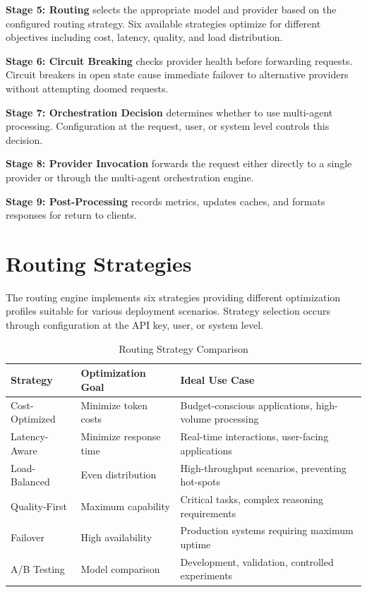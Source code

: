\documentclass[12pt,a4paper,twoside]{report}
\begin{document}
\textbf{Stage 5: Routing} selects the appropriate model and provider based on the configured routing strategy. Six available strategies optimize for different objectives including cost, latency, quality, and load distribution.

\textbf{Stage 6: Circuit Breaking} checks provider health before forwarding requests. Circuit breakers in open state cause immediate failover to alternative providers without attempting doomed requests.

\textbf{Stage 7: Orchestration Decision} determines whether to use multi-agent processing. Configuration at the request, user, or system level controls this decision.

\textbf{Stage 8: Provider Invocation} forwards the request either directly to a single provider or through the multi-agent orchestration engine.

\textbf{Stage 9: Post-Processing} records metrics, updates caches, and formats responses for return to clients.

\section{Routing Strategies}

The routing engine implements six strategies providing different optimization profiles suitable for various deployment scenarios. Strategy selection occurs through configuration at the API key, user, or system level.

\begin{table}[h]
\centering
\begin{tabular}{@{}p{3cm}p{3.5cm}p{5cm}@{}}
\toprule
\textbf{Strategy} & \textbf{Optimization Goal} & \textbf{Ideal Use Case} \\
\midrule
Cost-Optimized & Minimize token costs & Budget-conscious applications, high-volume processing \\
Latency-Aware & Minimize response time & Real-time interactions, user-facing applications \\
Load-Balanced & Even distribution & High-throughput scenarios, preventing hot-spots \\
Quality-First & Maximum capability & Critical tasks, complex reasoning requirements \\
Failover & High availability & Production systems requiring maximum uptime \\
A/B Testing & Model comparison & Development, validation, controlled experiments \\
\bottomrule
\end{tabular}
\caption{Routing Strategy Comparison}
\label{tab:routing-strategies}
\end{table}
\end{document}
